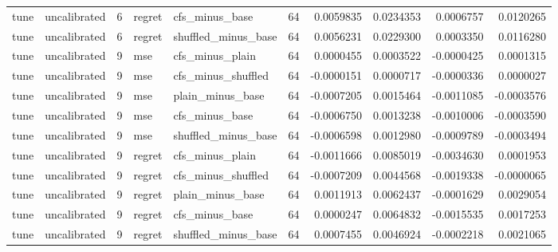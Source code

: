 \begin{tabular}{llrllrrrrr}
tune & uncalibrated & 6 & regret & cfs_minus_base & 64 & 0.0059835 & 0.0234353 & 0.0006757 & 0.0120265 \\
tune & uncalibrated & 6 & regret & shuffled_minus_base & 64 & 0.0056231 & 0.0229300 & 0.0003350 & 0.0116280 \\
tune & uncalibrated & 9 & mse & cfs_minus_plain & 64 & 0.0000455 & 0.0003522 & -0.0000425 & 0.0001315 \\
tune & uncalibrated & 9 & mse & cfs_minus_shuffled & 64 & -0.0000151 & 0.0000717 & -0.0000336 & 0.0000027 \\
tune & uncalibrated & 9 & mse & plain_minus_base & 64 & -0.0007205 & 0.0015464 & -0.0011085 & -0.0003576 \\
tune & uncalibrated & 9 & mse & cfs_minus_base & 64 & -0.0006750 & 0.0013238 & -0.0010006 & -0.0003590 \\
tune & uncalibrated & 9 & mse & shuffled_minus_base & 64 & -0.0006598 & 0.0012980 & -0.0009789 & -0.0003494 \\
tune & uncalibrated & 9 & regret & cfs_minus_plain & 64 & -0.0011666 & 0.0085019 & -0.0034630 & 0.0001953 \\
tune & uncalibrated & 9 & regret & cfs_minus_shuffled & 64 & -0.0007209 & 0.0044568 & -0.0019338 & -0.0000065 \\
tune & uncalibrated & 9 & regret & plain_minus_base & 64 & 0.0011913 & 0.0062437 & -0.0001629 & 0.0029054 \\
tune & uncalibrated & 9 & regret & cfs_minus_base & 64 & 0.0000247 & 0.0064832 & -0.0015535 & 0.0017253 \\
tune & uncalibrated & 9 & regret & shuffled_minus_base & 64 & 0.0007455 & 0.0046924 & -0.0002218 & 0.0021065 \\
\bottomrule
\end{tabular}
